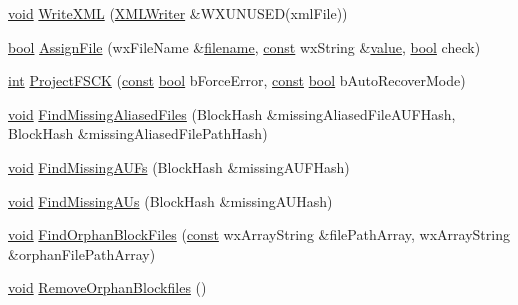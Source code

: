 \begin{DoxyCompactItemize}
\item 
\hyperlink{sound_8c_ae35f5844602719cf66324f4de2a658b3}{void} \hyperlink{class_dir_manager_a522fcb5579783fe0c03f9f185a733364}{Write\+X\+ML} (\hyperlink{class_x_m_l_writer}{X\+M\+L\+Writer} \&W\+X\+U\+N\+U\+S\+ED(xml\+File))
\item 
\hyperlink{mac_2config_2i386_2lib-src_2libsoxr_2soxr-config_8h_abb452686968e48b67397da5f97445f5b}{bool} \hyperlink{class_dir_manager_a9d9857b644d36aa53b8a670c3589e0ad}{Assign\+File} (wx\+File\+Name \&\hyperlink{test__portburn_8cpp_a7efa5e9c7494c7d4586359300221aa5d}{filename}, \hyperlink{getopt1_8c_a2c212835823e3c54a8ab6d95c652660e}{const} wx\+String \&\hyperlink{lib_2expat_8h_a4a30a13b813682e68c5b689b45c65971}{value}, \hyperlink{mac_2config_2i386_2lib-src_2libsoxr_2soxr-config_8h_abb452686968e48b67397da5f97445f5b}{bool} check)
\item 
\hyperlink{xmltok_8h_a5a0d4a5641ce434f1d23533f2b2e6653}{int} \hyperlink{class_dir_manager_a7c3519315b2b27687ad2eeeeb417361e}{Project\+F\+S\+CK} (\hyperlink{getopt1_8c_a2c212835823e3c54a8ab6d95c652660e}{const} \hyperlink{mac_2config_2i386_2lib-src_2libsoxr_2soxr-config_8h_abb452686968e48b67397da5f97445f5b}{bool} b\+Force\+Error, \hyperlink{getopt1_8c_a2c212835823e3c54a8ab6d95c652660e}{const} \hyperlink{mac_2config_2i386_2lib-src_2libsoxr_2soxr-config_8h_abb452686968e48b67397da5f97445f5b}{bool} b\+Auto\+Recover\+Mode)
\item 
\hyperlink{sound_8c_ae35f5844602719cf66324f4de2a658b3}{void} \hyperlink{class_dir_manager_a4b91c4ea0d07e7b0575265dd3272dcfd}{Find\+Missing\+Aliased\+Files} (Block\+Hash \&missing\+Aliased\+File\+A\+U\+F\+Hash, Block\+Hash \&missing\+Aliased\+File\+Path\+Hash)
\item 
\hyperlink{sound_8c_ae35f5844602719cf66324f4de2a658b3}{void} \hyperlink{class_dir_manager_a9673e7b4ad5a33ed2475f1a7fb6213aa}{Find\+Missing\+A\+U\+Fs} (Block\+Hash \&missing\+A\+U\+F\+Hash)
\item 
\hyperlink{sound_8c_ae35f5844602719cf66324f4de2a658b3}{void} \hyperlink{class_dir_manager_a4985cfbc2e7da34676460065a8a7d29d}{Find\+Missing\+A\+Us} (Block\+Hash \&missing\+A\+U\+Hash)
\item 
\hyperlink{sound_8c_ae35f5844602719cf66324f4de2a658b3}{void} \hyperlink{class_dir_manager_ace61e9d18bd93d3291d2b084f693e2ad}{Find\+Orphan\+Block\+Files} (\hyperlink{getopt1_8c_a2c212835823e3c54a8ab6d95c652660e}{const} wx\+Array\+String \&file\+Path\+Array, wx\+Array\+String \&orphan\+File\+Path\+Array)
\item 
\hyperlink{sound_8c_ae35f5844602719cf66324f4de2a658b3}{void} \hyperlink{class_dir_manager_a31f7a87e1321f9f71aea8751fd64c857}{Remove\+Orphan\+Blockfiles} ()

\end{DoxyCompactItemize}
